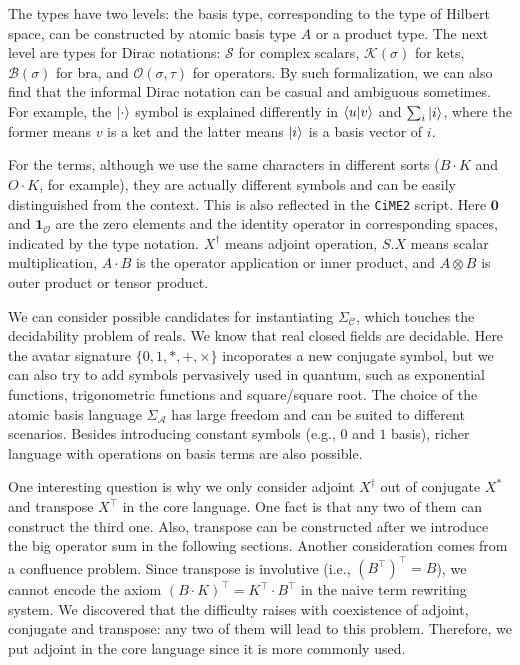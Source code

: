 The types have two levels: the basis type, corresponding to the type of Hilbert space, can be constructed by atomic basis type $A$ or a product type. The next level are types for Dirac notations: $\mathcal{S}$ for complex scalars, $\mathcal{K}(\sigma)$ for kets, $\mathcal{B}(\sigma)$ for bra, and $\mathcal{O}(\sigma, \tau)$ for operators. By such formalization, we can also find that the informal Dirac notation can be casual and ambiguous sometimes. For example, the $\ket{\cdot}$ symbol is explained differently in $\braket{u|v}$ and $\sum_{i}\ket{i}$, where the former means $v$ is a ket and the latter means $\ket{i}$ is a basis vector of $i$.

For the terms, although we use the same characters in different sorts ($B \cdot K$ and $O \cdot K$, for example), they are actually different symbols and can be easily distinguished from the context. This is also reflected in the \texttt{CiME2} script. Here $\mathbf{0}$ and $\mathbf{1}_\mathcal{O}$ are the zero elements and the identity operator in corresponding spaces, indicated by the type notation. $X^\dagger$ means adjoint operation, $S.X$ means scalar multiplication, $A \cdot B$ is the operator application or inner product, and $A \otimes B$ is outer product or tensor product.

We can consider possible candidates for instantiating $\Sigma_\mathcal{C}$, which touches the decidability problem of reals. We know that real closed fields are decidable\cite{Tarski1998}. Here the avatar signature $\{0, 1, *, +, \times\}$ incoporates a new conjugate symbol, but we can also try to add symbols pervasively used in quantum, such as exponential functions, trigonometric functions and square/square root.
The choice of the atomic basis language $\Sigma_\mathcal{A}$ has large freedom and can be suited to different scenarios. Besides introducing constant symbols (e.g., $0$ and $1$ basis), richer language with operations on basis terms are also possible. 

One interesting question is why we only consider adjoint $X^\dagger$ out of conjugate $X^*$ and transpose $X^\top$ in the core language. One fact is that any two of them can construct the third one. Also, transpose can be constructed after we introduce the big operator sum in the following sections. 
Another consideration comes from a confluence problem. Since transpose is involutive (i.e., $(B^\top)^\top = B$), we cannot encode the axiom $ (B \cdot K)^\top = K^\top \cdot B^\top$ in the naive term rewriting system. We discovered that the difficulty raises with coexistence of adjoint, conjugate and transpose: any two of them will lead to this problem. Therefore, we put adjoint in the core language since it is more commonly used.

